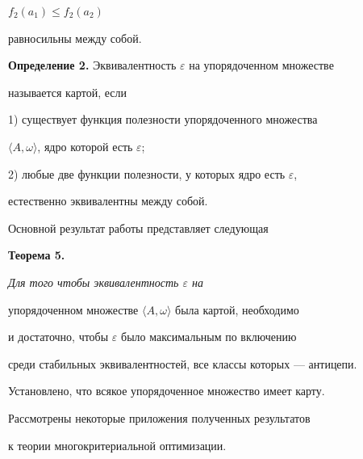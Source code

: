 $f_2(a_1)\le f_2(a_2)$


равносильны между собой.


\smallskip





{\bf Определение 2.} Эквивалентность $\varepsilon$ на упорядоченном множестве


называется картой, если





1) существует функция полезности упорядоченного множества


$\langle A,\omega\rangle$, ядро которой есть $\varepsilon$;





2) любые две функции полезности, у которых ядро есть $\varepsilon$,


естественно эквивалентны между собой.


\smallskip





Основной результат работы представляет следующая


\smallskip





{\bf Теорема 5.} {\it Для того чтобы эквивалентность $\varepsilon$ на


упорядоченном множестве $\langle A,\omega\rangle$ была картой, необходимо


и достаточно, чтобы $\varepsilon$ было максимальным по включению


среди стабильных эквивалентностей, все классы которых --- антицепи.}


\smallskip





Установлено, что всякое упорядоченное множество имеет карту.


Рассмотрены некоторые приложения полученных результатов


к теории многокритериальной оптимизации.


\bigskip














